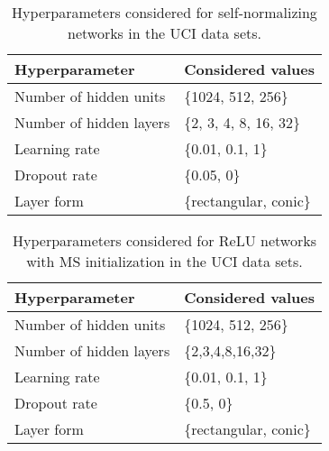 \documentclass{article}
\begin{document}
\begin{table}[htp]
\begin{center}
\caption{Hyperparameters considered for self-normalizing networks in the UCI data sets.}

\begin{tabular}{ll}
\toprule
Hyperparameter  & Considered values \\ 
\midrule
  Number of hidden units & \{1024, 512, 256\} \\
  Number of hidden layers & \{2, 3, 4, 8, 16, 32\} \\
  Learning rate & \{0.01, 0.1, 1\} \\
  Dropout rate & \{0.05, 0\}\\
  Layer form & \{rectangular, conic\} \\
\bottomrule
\end{tabular}
\end{center}

\end{table}

\begin{table}[htp]
\begin{center}
\caption[Hyperparameters considered for ReLU networks in the UCI data sets.]{Hyperparameters considered for ReLU networks with MS initialization in the UCI data sets.}

\begin{tabular}{ll}
\toprule
Hyperparameter  & Considered values \\ 
\midrule
   Number of hidden units & \{1024, 512, 256\} \\
  Number of hidden layers & \{2,3,4,8,16,32\} \\
  Learning rate & \{0.01, 0.1, 1\} \\
  Dropout rate & \{0.5, 0\}\\
  Layer form & \{rectangular, conic\} \\
\bottomrule
\end{tabular}
\end{center}

\end{table}
\end{document}
